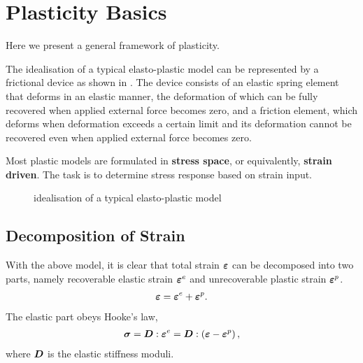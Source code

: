 \chapter{Plasticity Basics}
Here we present a general framework of plasticity.

The idealisation of a typical elasto-plastic model can be represented by a frictional device as shown in . The device consists of an elastic spring element that deforms in an elastic manner, the deformation of which can be fully recovered when applied external force becomes zero, and a friction element, which deforms when deformation exceeds a certain limit and its deformation cannot be recovered even when applied external force becomes zero.

Most plastic models are formulated in \textbf{stress space}, or equivalently, \textbf{strain driven}. The task is to determine stress response based on strain input.
\begin{figure}[ht]
\centering
{}
\caption{idealisation of a typical elasto-plastic model}\label{fig:idealisation}
\end{figure}
\section{Decomposition of Strain}
With the above model, it is clear that total strain $\bm{\varepsilon}$ can be decomposed into two parts, namely recoverable elastic strain $\bm{\varepsilon}^e$ and unrecoverable plastic strain $\bm{\varepsilon}^p$.
\begin{gather}
\bm{\varepsilon}=\bm{\varepsilon}^e+\bm{\varepsilon}^p.
\end{gather}
The elastic part obeys Hooke's law,
\begin{gather}\label{eq:strain_decomposition}
\bm{\sigma}=\bm{D}:\bm{\varepsilon}^e=\bm{D}:\left(\bm{\varepsilon}-\bm{\varepsilon}^p\right),
\end{gather}
where $\bm{D}$ is the elastic stiffness moduli.
